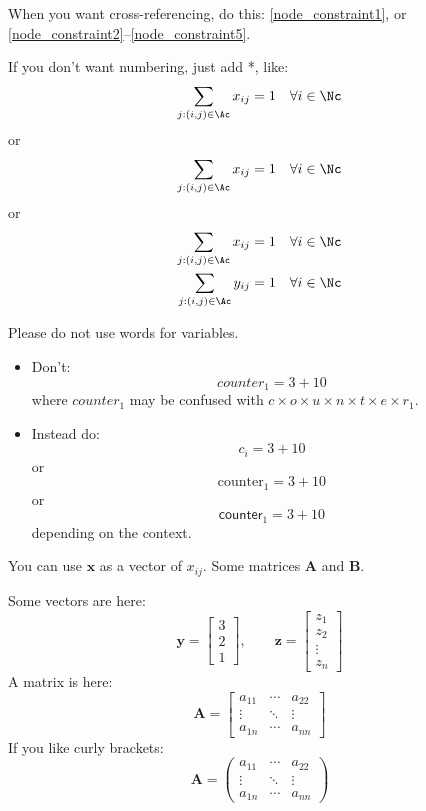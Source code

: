 \documentclass[letterpaper, 11pt]{article}
\renewcommand{\vec}[1]{\bm{#1}}
\newcommand{\mat}[1]{\bm{#1}}
\begin{document}
When you want cross-referencing, do this: \eqref{node_constraint1}, or \eqref{node_constraint2}--\eqref{node_constraint5}.

If you don't want numbering, just add *, like:
\begin{equation*}
	\sum_{j:(i,j)\in\Ac} x_{ij} = 1 \quad \forall i\in\Nc
\end{equation*}
or
\[
	\sum_{j:(i,j)\in\Ac} x_{ij} = 1 \quad \forall i\in\Nc
\]
or
\begin{align*}
	\sum_{j:(i,j)\in\Ac} x_{ij} = 1 \quad & \forall i\in\Nc \\
	\sum_{j:(i,j)\in\Ac} y_{ij} = 1 \quad & \forall i\in\Nc \\
\end{align*}

Please do not use words for variables. 
\begin{itemize}
\item Don't:
	\[
		counter_1 = 3 + 10 
	\]
	where $counter_1$ may be confused with $c \times o \times u \times n \times t \times e \times r_1$.

\item Instead do:
	\[
		c_i = 3 + 10
	\]
	or
	\[
		\text{counter}_1 = 3 + 10
	\]
	or
	\[
		\textsf{counter}_1 = 3 + 10
	\]
depending on the context.
\end{itemize}


You can use $\vec{x}$ as a vector of $x_{ij}$. Some matrices $\mat{A}$ and $\mat{B}$.

Some vectors are here:
\[
	\vec{y} = \begin{bmatrix} 3 \\ 2 \\ 1 \end{bmatrix}, \qquad
	\vec{z} = \begin{bmatrix} z_1 \\ z_2 \\ \vdots \\ z_n \end{bmatrix}
\]
A matrix is here:
\[
	\mat{A} = \begin{bmatrix} a_{11} & \cdots & a_{22}  \\
							  \vdots & \ddots & \vdots  \\
							  a_{1n} & \cdots & a_{nn}  \end{bmatrix}
\]
If you like curly brackets:
\[
	\mat{A} = \begin{pmatrix} a_{11} & \cdots & a_{22}  \\
							  \vdots & \ddots & \vdots  \\
							  a_{1n} & \cdots & a_{nn}  \end{pmatrix}
\]
\end{document}
